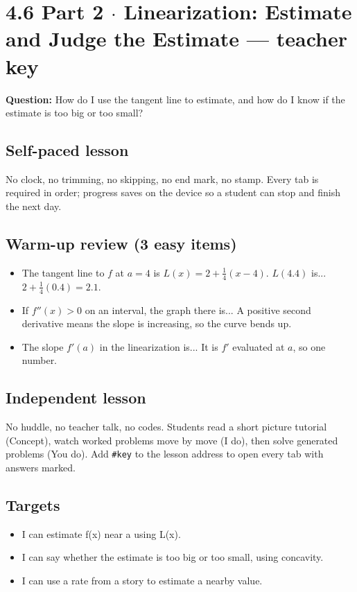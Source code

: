 \documentclass[11pt]{article}
\begin{document}
\section*{4.6 Part 2 $\cdot$ Linearization: Estimate and Judge the Estimate --- teacher key}
\textbf{Question:} How do I use the tangent line to estimate, and how do I know if the estimate is too big or too small?\par
\subsection*{Self-paced lesson}No clock, no trimming, no skipping, no end mark, no stamp. Every tab is required in order; progress saves on the device so a student can stop and finish the next day.\par
\subsection*{Warm-up review (3 easy items)}\begin{itemize}
\item The tangent line to $f$ at $a=4$ is $L(x)=2+\tfrac14(x-4)$. $L(4.4)$ is...  $2+\tfrac14(0.4)=2.1$.
\item If $f''(x)>0$ on an interval, the graph there is...  A positive second derivative means the slope is increasing, so the curve bends up.
\item The slope $f'(a)$ in the linearization is...  It is $f'$ evaluated at $a$, so one number.
\end{itemize}
\subsection*{Independent lesson}No huddle, no teacher talk, no codes. Students read a short picture tutorial (Concept), watch worked problems move by move (I do), then solve generated problems (You do). Add \texttt{\#key} to the lesson address to open every tab with answers marked.\par
\subsection*{Targets}\begin{itemize}\item I can estimate f(x) near a using L(x).
\item I can say whether the estimate is too big or too small, using concavity.
\item I can use a rate from a story to estimate a nearby value.\end{itemize}
\end{document}
